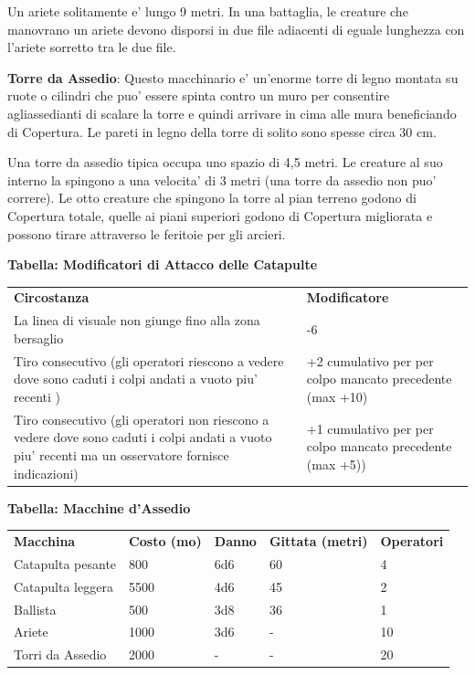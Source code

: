 \documentclass[a4paper,11pt,twoside,openany]{book}
\begin{document}
Un ariete solitamente e' lungo 9 metri. In una battaglia, le creature che manovrano un ariete devono disporsi in due file adiacenti di eguale lunghezza con l'ariete sorretto tra le due file. 

\textbf{Torre da Assedio}: Questo macchinario e' un'enorme torre di legno montata su ruote o cilindri che puo' essere spinta contro un muro per consentire agliassedianti di scalare la torre e quindi arrivare in cima alle mura beneficiando di Copertura. Le pareti in legno della torre di solito sono spesse circa 30 cm.

Una torre da assedio tipica occupa uno spazio di 4,5 metri. Le creature al suo interno la spingono a una velocita' di 3 metri (una torre da assedio non puo' correre). Le otto creature che spingono la torre al pian terreno godono di Copertura totale, quelle ai piani superiori godono di Copertura migliorata e possono tirare attraverso le feritoie per gli arcieri.

\bigskip

\textbf{Tabella: Modificatori di Attacco delle Catapulte}

\begin{tabular}{L{10cm} L{6cm}} 
\toprule
\textbf{Circostanza} & \textbf{Modificatore}\tabularnewline
La linea di visuale non giunge fino alla zona bersaglio & -6\tabularnewline
Tiro consecutivo (gli operatori riescono a vedere dove sono caduti i colpi andati a vuoto piu' recenti ) &+2 cumulativo per per colpo  mancato precedente (max +10)\tabularnewline
Tiro consecutivo (gli operatori non riescono a vedere dove sono caduti i colpi andati a vuoto piu' recenti ma un osservatore fornisce indicazioni) & +1 cumulativo per per colpo mancato precedente (max +5))\tabularnewline
\end{tabular}

\bigskip

\textbf{Tabella: Macchine d'Assedio}

\medskip

\begin{tabular}{lllll}
\toprule
\textbf{Macchina} & \textbf{Costo (mo)} & \textbf{Danno} & \textbf{Gittata (metri)} & \textbf{Operatori}\tabularnewline
Catapulta pesante & 800 & 6d6 & 60 & 4\tabularnewline
Catapulta leggera & 5500 & 4d6 & 45 & 2\tabularnewline
Ballista & 500 & 3d8 & 36 & 1\tabularnewline
Ariete & 1000 & 3d6 & - & 10\tabularnewline
Torri da Assedio & 2000 & - & - & 20\tabularnewline
\end{tabular}

\bigskip
\end{document}
